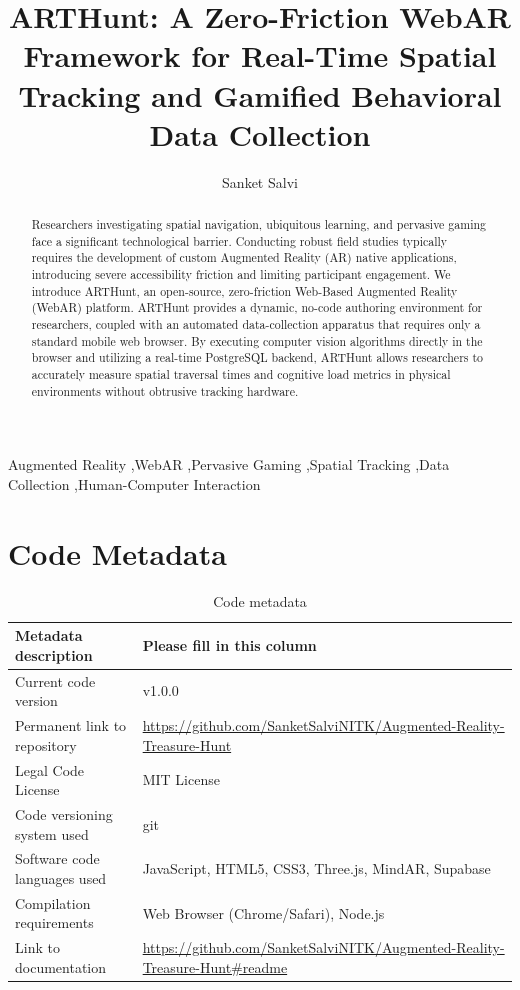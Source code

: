 \documentclass[3p,times]{elsarticle}
\begin{document}
\begin{frontmatter}

\title{ARTHunt: A Zero-Friction WebAR Framework for Real-Time Spatial Tracking and Gamified Behavioral Data Collection}

\author{Sanket Salvi}
\address{National Institute of Technology Karnataka (NITK)}

\begin{abstract}
Researchers investigating spatial navigation, ubiquitous learning, and pervasive gaming face a significant technological barrier. Conducting robust field studies typically requires the development of custom Augmented Reality (AR) native applications, introducing severe accessibility friction and limiting participant engagement. We introduce ARTHunt, an open-source, zero-friction Web-Based Augmented Reality (WebAR) platform. ARTHunt provides a dynamic, no-code authoring environment for researchers, coupled with an automated data-collection apparatus that requires only a standard mobile web browser. By executing computer vision algorithms directly in the browser and utilizing a real-time PostgreSQL backend, ARTHunt allows researchers to accurately measure spatial traversal times and cognitive load metrics in physical environments without obtrusive tracking hardware.
\end{abstract}

\begin{keyword}
Augmented Reality \sep WebAR \sep Pervasive Gaming \sep Spatial Tracking \sep Data Collection \sep Human-Computer Interaction
\end{keyword}

\end{frontmatter}

\linenumbers

\section{Code Metadata}
\label{sec:metadata}

\begin{table}[h]
\centering
\begin{tabular}{|l|p{8cm}|}
\hline
\textbf{Metadata description} & \textbf{Please fill in this column} \\
\hline
Current code version & v1.0.0 \\
\hline
Permanent link to repository & \url{https://github.com/SanketSalviNITK/Augmented-Reality-Treasure-Hunt} \\
\hline
Legal Code License & MIT License \\
\hline
Code versioning system used & git \\
\hline
Software code languages used & JavaScript, HTML5, CSS3, Three.js, MindAR, Supabase \\
\hline
Compilation requirements & Web Browser (Chrome/Safari), Node.js \\
\hline
Link to documentation & \url{https://github.com/SanketSalviNITK/Augmented-Reality-Treasure-Hunt#readme} \\
\hline
\end{tabular}
\caption{Code metadata}
\label{table:metadata}
\end{table}
\end{document}
